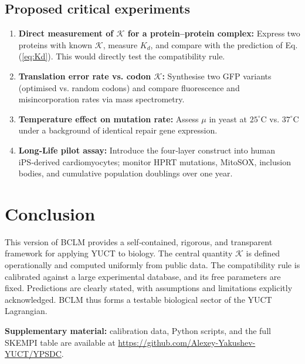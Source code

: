 \documentclass[12pt,a4paper]{article}
\newcommand{\REL}{\mathcal{K}}          %
\begin{document}
	\subsection{Proposed critical experiments}
	\begin{enumerate}
		\item \textbf{Direct measurement of \(\REL\) for a protein–protein complex:} Express two proteins with known \(\REL\), measure \(K_d\), and compare with the prediction of Eq.(\ref{eq:Kd}). This would directly test the compatibility rule.
		\item \textbf{Translation error rate vs. codon \(\REL\):} Synthesise two GFP variants (optimised vs. random codons) and compare fluorescence and misincorporation rates via mass spectrometry.
		\item \textbf{Temperature effect on mutation rate:} Assess \(\mu\) in yeast at \(25^\circ\text{C}\) vs. \(37^\circ\text{C}\) under a background of identical repair gene expression.
		\item \textbf{Long‑Life pilot assay:} Introduce the four‑layer construct into human iPS‑derived cardiomyocytes; monitor HPRT mutations, MitoSOX, inclusion bodies, and cumulative population doublings over one year.
	\end{enumerate}
	
	\section{Conclusion}
	This version of BCLM provides a self‑contained, rigorous, and transparent framework for applying YUCT to biology. The central quantity \(\REL\) is defined operationally and computed uniformly from public data. The compatibility rule is calibrated against a large experimental database, and its free parameters are fixed. Predictions are clearly stated, with assumptions and limitations explicitly acknowledged. BCLM thus forms a testable biological sector of the YUCT Lagrangian.
	
	\vspace{0.5cm}
	\noindent\textbf{Supplementary material:} calibration data, Python scripts, and the full SKEMPI table are available at \url{https://github.com/Alexey-Yakushev-YUCT/YPSDC}.
	
\end{document}
